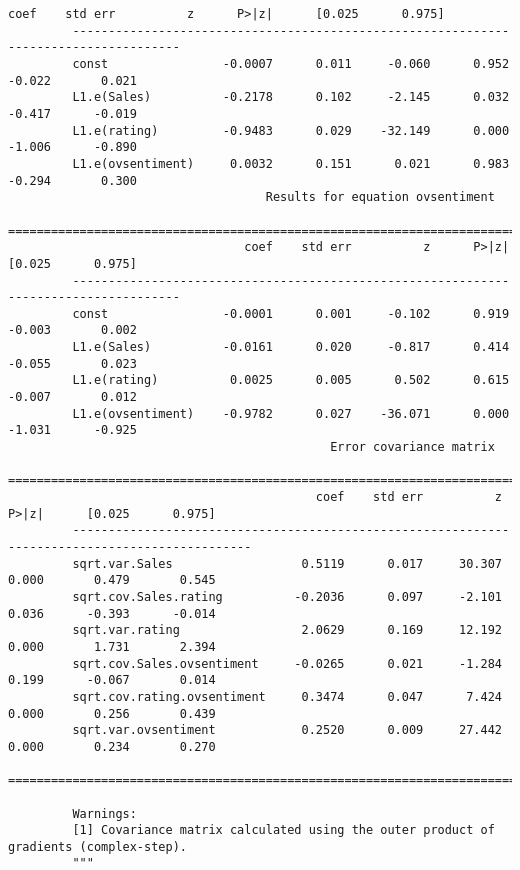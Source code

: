 \documentclass[11pt]{article}
\begin{document}
\begin{Verbatim}[commandchars=\\\{\}]
                                 coef    std err          z      P>|z|      [0.025      0.975]
         -------------------------------------------------------------------------------------
         const                -0.0007      0.011     -0.060      0.952      -0.022       0.021
         L1.e(Sales)          -0.2178      0.102     -2.145      0.032      -0.417      -0.019
         L1.e(rating)         -0.9483      0.029    -32.149      0.000      -1.006      -0.890
         L1.e(ovsentiment)     0.0032      0.151      0.021      0.983      -0.294       0.300
                                    Results for equation ovsentiment                          
         =====================================================================================
                                 coef    std err          z      P>|z|      [0.025      0.975]
         -------------------------------------------------------------------------------------
         const                -0.0001      0.001     -0.102      0.919      -0.003       0.002
         L1.e(Sales)          -0.0161      0.020     -0.817      0.414      -0.055       0.023
         L1.e(rating)          0.0025      0.005      0.502      0.615      -0.007       0.012
         L1.e(ovsentiment)    -0.9782      0.027    -36.071      0.000      -1.031      -0.925
                                             Error covariance matrix                                    
         ===============================================================================================
                                           coef    std err          z      P>|z|      [0.025      0.975]
         -----------------------------------------------------------------------------------------------
         sqrt.var.Sales                  0.5119      0.017     30.307      0.000       0.479       0.545
         sqrt.cov.Sales.rating          -0.2036      0.097     -2.101      0.036      -0.393      -0.014
         sqrt.var.rating                 2.0629      0.169     12.192      0.000       1.731       2.394
         sqrt.cov.Sales.ovsentiment     -0.0265      0.021     -1.284      0.199      -0.067       0.014
         sqrt.cov.rating.ovsentiment     0.3474      0.047      7.424      0.000       0.256       0.439
         sqrt.var.ovsentiment            0.2520      0.009     27.442      0.000       0.234       0.270
         ===============================================================================================
         
         Warnings:
         [1] Covariance matrix calculated using the outer product of gradients (complex-step).
         """
\end{Verbatim}
            
\end{document}
